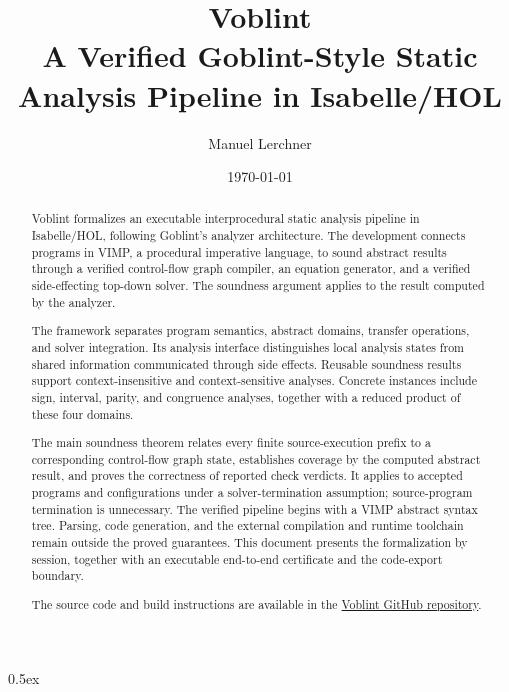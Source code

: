 \documentclass[10pt,a4paper,oneside]{report}
\begin{document}
\title{Voblint\\[1ex]\large
  A Verified Goblint-Style Static Analysis Pipeline in Isabelle/HOL}
\author{Manuel Lerchner}
\date{\today}
\hypersetup{pageanchor=false}
\maketitle
\begin{abstract}
Voblint formalizes an executable interprocedural static analysis pipeline in
Isabelle/HOL, following Goblint's analyzer architecture. The development connects
programs in VIMP, a procedural imperative language, to sound abstract results
through a verified control-flow graph compiler, an equation generator, and a
verified side-effecting top-down solver. The soundness argument applies to the
result computed by the analyzer.

The framework separates program semantics, abstract domains, transfer
operations, and solver integration. Its analysis interface distinguishes local
analysis states from shared information communicated through side effects.
Reusable soundness results support context-insensitive and context-sensitive
analyses. Concrete instances include sign, interval, parity, and congruence
analyses, together with a reduced product of these four domains.

The main soundness theorem relates every finite source-execution prefix to a
corresponding control-flow graph state, establishes coverage by the computed
abstract result, and proves the correctness of reported check verdicts. It
applies to accepted programs and configurations under a solver-termination
assumption; source-program termination is unnecessary. The verified pipeline
begins with a VIMP abstract syntax tree. Parsing, code generation, and the
external compilation and runtime toolchain remain outside the proved
guarantees. This document presents the formalization by session, together with
an executable end-to-end certificate and the code-export boundary.

The source code and build instructions are available in the
\href{https://github.com/ManuelLerchner/Voblint-Verification-Master-Thesis}
{Voblint GitHub repository}.
\end{abstract}
\hypersetup{pageanchor=true}
\tableofcontents
\clearpage
{}
\parindent 0pt
\parskip 0.5ex

\end{document}
